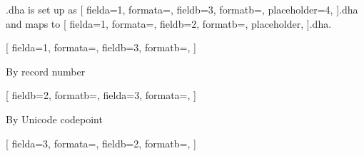 \documentclass{article}
\begin{document}

.dha is set up as 
[
fielda=1,
formata=,
fieldb=3,
formatb=\small,
placeholder=4,
]{.dha}
and maps to
[
fielda=1,
formata=,
fieldb=2,
formatb=\fdevb,
placeholder,
]{.dha}.


\newpage
{}[
fielda=1,
formata=,
fieldb=3,
formatb=\small,
]


\newpage
By record number


[
fieldb=2,
formatb=\fdevb\Large,
fielda=3,
formata=\small,
]



\newpage
By Unicode codepoint


[
fielda=3,
formata=\small,
fieldb=2,
formatb=\fdevb\huge\color{blue},
]
\end{document}
